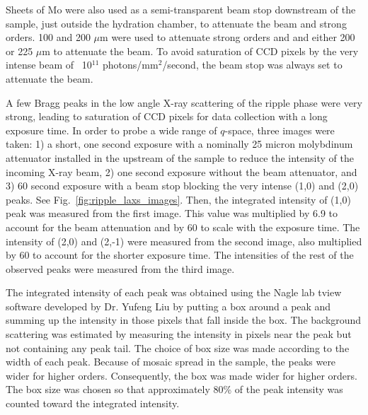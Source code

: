 Sheets of Mo were also used as a semi-transparent beam stop downstream of the sample, just 
outside the hydration chamber, to attenuate the beam and strong orders.
100 and 200 $\mu$m were used to attenuate strong orders and 
and either 200 or 225 $\mu$m to attenuate the beam. To avoid saturation of CCD pixels by
the very intense beam of ~10$^{11}$ photons/mm$^2$/second, 
the beam stop was always set to attenuate the beam.

A few Bragg peaks in the low angle X-ray scattering of the ripple phase
were very strong, leading to saturation of CCD pixels for data collection
with a long exposure time. 
In order to probe a wide range of $q$-space, three images were taken:
1) a short, one second exposure with a nominally 25 micron 
molybdinum attenuator installed in the upstream of the sample to reduce the intensity
of the incoming X-ray beam, 2) one second exposure without the beam attenuator,
and 3) 60 second exposure with a beam stop blocking the very intense 
(1,0) and (2,0) peaks. See Fig.~\ref{fig:ripple_laxs_images}. 
Then, the integrated intensity of (1,0) peak was measured
from the first image. This value was multiplied by 6.9 to account for the beam
attenuation and by 60 to scale with the exposure time. 
The intensity of (2,0) and (2,-1) were measured from the second image, also
multiplied by 60 to account for the shorter exposure time. The intensities of
the rest of the observed peaks were measured from the third image.

The integrated intensity of each peak was obtained using the Nagle lab tview
software developed by Dr. Yufeng Liu \cite{Liu03} by putting a box around a
peak and summing up the intensity in those pixels that fall inside the box.
The background scattering was estimated by measuring the intensity in pixels
near the peak but not containing any peak tail. The choice of box size was 
made according to the width of each peak. Because of mosaic spread in the sample,
the peaks were wider for higher orders. 
Consequently, the box was made wider for higher
orders. The box size was chosen so that approximately 80\% of the peak intensity
was counted toward the integrated intensity.

